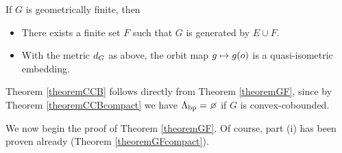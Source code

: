 \begin{theorem}
\label{theoremGF}
If $G$ is geometrically finite, then
\begin{itemize}
\item[(i)] There exists a finite set $F$ such that $G$ is generated by $E\cup F$.
\item[(ii)] With the metric $d_G$ as above, the orbit map $g\mapsto g(o)$ is a quasi-isometric embedding.
\end{itemize}
\end{theorem}

\begin{observation}
\label{observationGFCCB}
Theorem \ref{theoremCCB} follows directly from Theorem \ref{theoremGF}, since by Theorem \ref{theoremCCBcompact} we have $\Lbp = \emptyset$ if $G$ is convex-cobounded.
\end{observation}


We now begin the proof of Theorem \ref{theoremGF}. Of course, part (i) has been proven already (Theorem \ref{theoremGFcompact}).%

